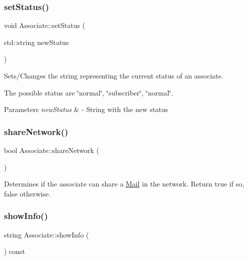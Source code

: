 \subsubsection{\texorpdfstring{set\+Status()}{setStatus()}}
{\footnotesize\ttfamily void Associate\+::set\+Status (\begin{DoxyParamCaption}\item[{std\+::string}]{new\+Status }\end{DoxyParamCaption})}



Sets/\+Changes the string representing the current status of an associate. 

The possible status are \char`\"{}normal\char`\"{}, \char`\"{}subscriber\char`\"{}, \char`\"{}normal\char`\"{}.


\begin{DoxyParams}{Parameters}
{\em new\+Status} & -\/ String with the new status \\
\hline
\end{DoxyParams}
\mbox{\label{classAssociate_a9b836ab2c289e4fd8778c2fe01db6dfe}} 
\subsubsection{\texorpdfstring{share\+Network()}{shareNetwork()}}
{\footnotesize\ttfamily bool Associate\+::share\+Network (\begin{DoxyParamCaption}{ }\end{DoxyParamCaption})}



Determines if the associate can share a \mbox{\hyperlink{classMail}{Mail}} in the network. Return true if so, false otherwise. 

\mbox{\label{classAssociate_a5a47029128dc79e09527552c244da9af}} 
\subsubsection{\texorpdfstring{show\+Info()}{showInfo()}}
{\footnotesize\ttfamily string Associate\+::show\+Info (\begin{DoxyParamCaption}{ }\end{DoxyParamCaption}) const}




